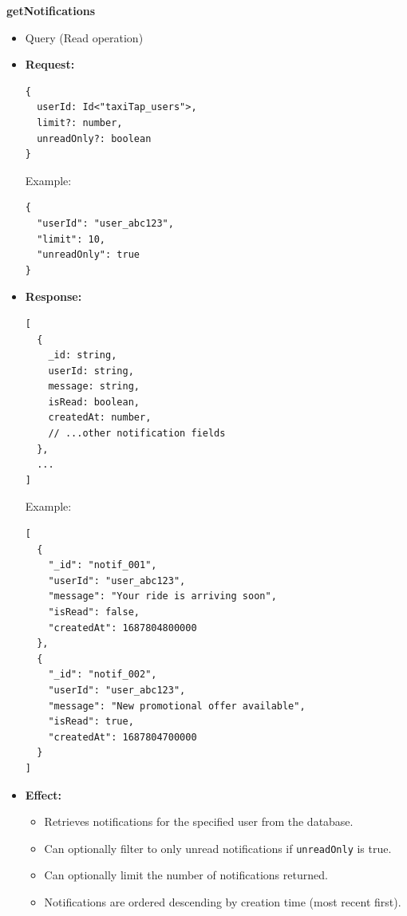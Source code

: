 \documentclass[a4paper,12pt]{article}
\begin{document}
\item \textbf{getNotifications}
  \begin{itemize}
    \item Query (Read operation)
    \item \textbf{Request:}
    \begin{verbatim}
{
  userId: Id<"taxiTap_users">,
  limit?: number,
  unreadOnly?: boolean
}
    \end{verbatim}
    Example:
    \begin{verbatim}
{
  "userId": "user_abc123",
  "limit": 10,
  "unreadOnly": true
}
    \end{verbatim}
    \item \textbf{Response:}
    \begin{verbatim}
[
  {
    _id: string,
    userId: string,
    message: string,
    isRead: boolean,
    createdAt: number,
    // ...other notification fields
  },
  ...
]
    \end{verbatim}
    Example:
    \begin{verbatim}
[
  {
    "_id": "notif_001",
    "userId": "user_abc123",
    "message": "Your ride is arriving soon",
    "isRead": false,
    "createdAt": 1687804800000
  },
  {
    "_id": "notif_002",
    "userId": "user_abc123",
    "message": "New promotional offer available",
    "isRead": true,
    "createdAt": 1687804700000
  }
]
    \end{verbatim}
    \item \textbf{Effect:}
    \begin{itemize}
      \item Retrieves notifications for the specified user from the database.
      \item Can optionally filter to only unread notifications if \texttt{unreadOnly} is true.
      \item Can optionally limit the number of notifications returned.
      \item Notifications are ordered descending by creation time (most recent first).
    \end{itemize}
  \end{itemize}
\end{document}
